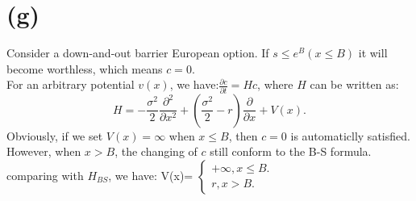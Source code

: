 \documentclass[12pt,a4paper]{paper}
\begin{document}
\section{(g)}
\indent Consider a down-and-out barrier European option. If $s\leq e^B(x\leq B)$ it will become worthless, which means $c=0$. \\
\indent For an arbitrary potential $v(x)$, we have:$\frac{\partial c}{\partial t}=Hc$, where $H$ can be written as:
\begin{equation}
H=-\frac{\sigma ^2}{2}\frac{\partial^2 }{\partial x^2}+(\frac{\sigma^2}{2} -r)\frac{\partial }{\partial x}+V(x).
\end{equation}
\indent Obviously, if we set $V(x)=\infty$ when $x\leq B$, then $c=0$ is automaticlly satisfied. However, when $x>B$, the changing of $c$ still conform to the B-S formula. comparing with $H_{BS}$, we have:
V(x)=
$\left\{\begin{matrix}
+\infty,x\leq B.\\
r,x>B.
\end{matrix}\right.$
\end{document}
